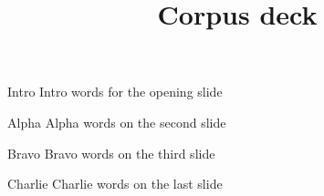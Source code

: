 \documentclass{beamer}
\title{Corpus deck}
\begin{document}
\begin{frame}{Intro}
  Intro words for the opening slide
\end{frame}
\begin{frame}{Alpha}
  Alpha words on the second slide
\end{frame}
\begin{frame}{Bravo}
  Bravo words on the third slide
\end{frame}
\begin{frame}{Charlie}
  Charlie words on the last slide
\end{frame}
\end{document}
